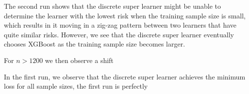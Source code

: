 \documentclass[11pt, a4paper]{article}
\theoremstyle{definition}
\theoremstyle{remark}
\begin{document}
The second run shows that the discrete super learner might be unable to determine the learner with the lowest risk when the training sample size is small, which results in it moving in a zig-zag pattern between two learners that have quite similar risks. However, we see that the discrete super learner eventually chooses XGBoost as the training sample size becomes larger.  


For $ n > 1200 $ we then observe a shift 

In the first run, we observe that the discrete super learner achieves the minimum loss for all sample sizes, the first run is perfectly  

\printbibliography
\end{document}
